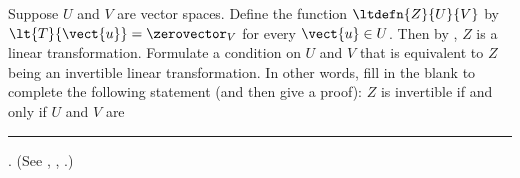 Suppose $U$ and $V$ are vector spaces.  Define the function $\ltdefn{Z}{U}{V}$ by $\lt{T}{\vect{u}}=\zerovector_{V}$ for every $\vect{u}\in U$.  Then by , $Z$ is a linear transformation.  Formulate a condition on $U$ and $V$ that is equivalent to $Z$ being an invertible linear transformation.   In other words, fill in the blank to complete the following statement (and then give a proof):  $Z$ is invertible if and only if $U$ and $V$ are \rule{1in}{1pt}. (See , , .)